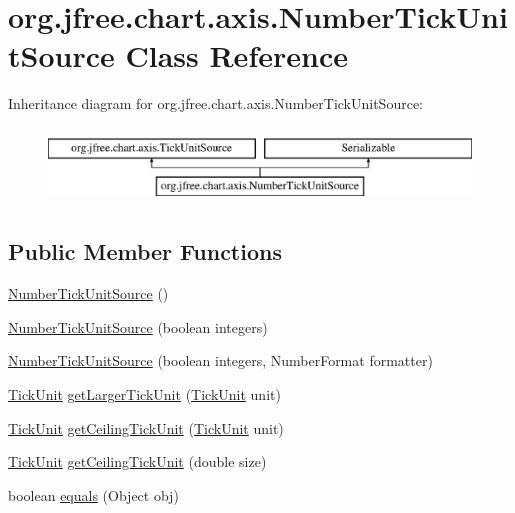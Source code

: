 \hypertarget{classorg_1_1jfree_1_1chart_1_1axis_1_1_number_tick_unit_source}{}\section{org.\+jfree.\+chart.\+axis.\+Number\+Tick\+Unit\+Source Class Reference}
\label{classorg_1_1jfree_1_1chart_1_1axis_1_1_number_tick_unit_source}
Inheritance diagram for org.\+jfree.\+chart.\+axis.\+Number\+Tick\+Unit\+Source\+:\begin{figure}[H]
\begin{center}
\leavevmode
\includegraphics[height=2.000000cm]{classorg_1_1jfree_1_1chart_1_1axis_1_1_number_tick_unit_source}
\end{center}
\end{figure}
\subsection*{Public Member Functions}
\begin{DoxyCompactItemize}
\item 
\mbox{\hyperlink{classorg_1_1jfree_1_1chart_1_1axis_1_1_number_tick_unit_source_a88470aae8e9aff0a7ad8e120ec354eb3}{Number\+Tick\+Unit\+Source}} ()
\item 
\mbox{\hyperlink{classorg_1_1jfree_1_1chart_1_1axis_1_1_number_tick_unit_source_af1f043577ea03a057e0b3caa58165230}{Number\+Tick\+Unit\+Source}} (boolean integers)
\item 
\mbox{\hyperlink{classorg_1_1jfree_1_1chart_1_1axis_1_1_number_tick_unit_source_abe7fac69efaf7b4a81a523655d65e50c}{Number\+Tick\+Unit\+Source}} (boolean integers, Number\+Format formatter)
\item 
\mbox{\hyperlink{classorg_1_1jfree_1_1chart_1_1axis_1_1_tick_unit}{Tick\+Unit}} \mbox{\hyperlink{classorg_1_1jfree_1_1chart_1_1axis_1_1_number_tick_unit_source_a9194262fa7438a0f037a343f7de51eab}{get\+Larger\+Tick\+Unit}} (\mbox{\hyperlink{classorg_1_1jfree_1_1chart_1_1axis_1_1_tick_unit}{Tick\+Unit}} unit)
\item 
\mbox{\hyperlink{classorg_1_1jfree_1_1chart_1_1axis_1_1_tick_unit}{Tick\+Unit}} \mbox{\hyperlink{classorg_1_1jfree_1_1chart_1_1axis_1_1_number_tick_unit_source_a8f94f7cddfff2ddf4d57b4e0abe11a12}{get\+Ceiling\+Tick\+Unit}} (\mbox{\hyperlink{classorg_1_1jfree_1_1chart_1_1axis_1_1_tick_unit}{Tick\+Unit}} unit)
\item 
\mbox{\hyperlink{classorg_1_1jfree_1_1chart_1_1axis_1_1_tick_unit}{Tick\+Unit}} \mbox{\hyperlink{classorg_1_1jfree_1_1chart_1_1axis_1_1_number_tick_unit_source_a552cf17dfcced017ee6497a433a9467a}{get\+Ceiling\+Tick\+Unit}} (double size)
\item 
boolean \mbox{\hyperlink{classorg_1_1jfree_1_1chart_1_1axis_1_1_number_tick_unit_source_acae6a5afddf87981e89820575abed4a5}{equals}} (Object obj)
\end{DoxyCompactItemize}


